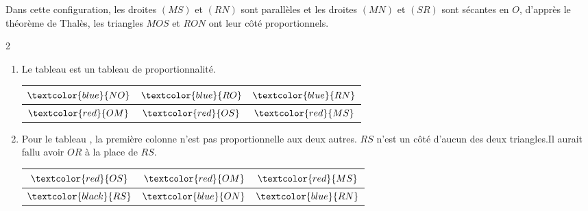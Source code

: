\begin{corrige}
    \phantom{rrr}   

    \begin{minipage}{.5\textwidth} 
       Dans cette configuration, les droites $(MS)$ et $(RN)$ sont parallèles et les droites $(MN)$ et $(SR)$
        sont sécantes en $O$, d'apprès le théorème de Thalès, les triangles $MOS$ et $RON$ ont leur côté proportionnels.
    \end{minipage}
    \hfill
    \begin{minipage}{.4\textwidth} 
    \end{minipage}
    \begin{multicols}2
        \begin{enumerate}
            \item Le tableau  est un tableau de proportionnalité.

            \begin{tabular}{c|c|c}
                $\textcolor{blue}{NO}$&$\textcolor{blue}{RO}$&$\textcolor{blue}{RN}$\\ \hline
                $\textcolor{red}{OM}$&$\textcolor{red}{OS}$&$\textcolor{red}{MS}$\\
            \end{tabular}

            \item Pour le tableau , la première colonne n'est pas proportionnelle aux deux autres.
            $RS$ n'est un côté d'aucun des deux triangles.Il aurait fallu avoir $OR$ à la place de $RS$.

            \begin{tabular}{c|c|c}
                $\textcolor{red}{OS}$&$\textcolor{red}{OM}$&$\textcolor{red}{MS}$\\ \hline
                $\textcolor{black}{RS}$&$\textcolor{blue}{ON}$&$\textcolor{blue}{RN}$\\                 
            \end{tabular}
            \columnbreak
            

\end{enumerate}
\end{multicols}
\end{corrige}
